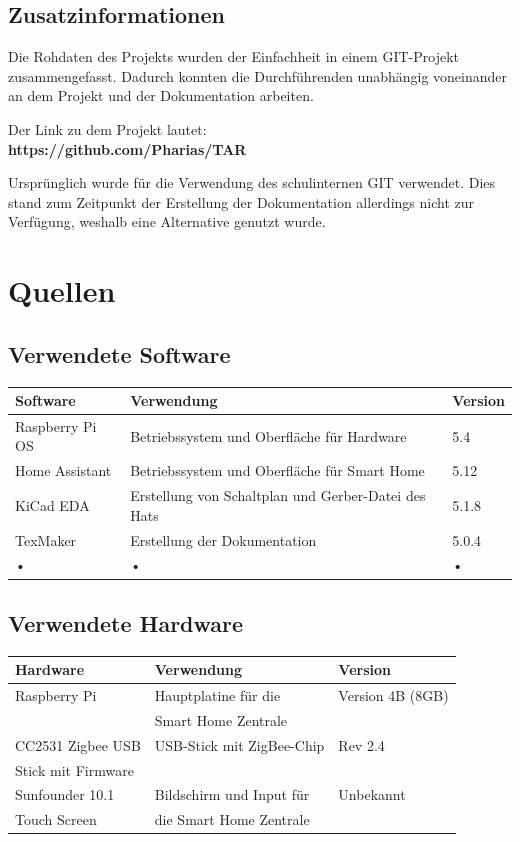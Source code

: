 \documentclass[12pt,a4paper]{article}
\begin{document}
 	\subsection{Zusatzinformationen}
 	Die Rohdaten des Projekts wurden der Einfachheit in einem GIT-Projekt zusammengefasst. Dadurch konnten die Durchführenden unabhängig voneinander an dem Projekt und der Dokumentation arbeiten.\par
 	Der Link zu dem Projekt lautet:\\
 	\textbf{https://github.com/Pharias/TAR}\par
 	Ursprünglich wurde für die Verwendung des schulinternen GIT verwendet. Dies stand zum Zeitpunkt der Erstellung der Dokumentation allerdings nicht zur Verfügung, weshalb eine Alternative genutzt wurde.
 	\newpage
 	\section{Quellen}
 	\subsection{Verwendete Software}
 	\begin{tabular}{|l|l|l|}
 	\hline 
 	\textbf{Software} & \textbf{Verwendung} & \textbf{Version} \\ 
 	\hline 
 	Raspberry Pi OS & Betriebssystem und Oberfläche für Hardware & 5.4 \\ 
 	\hline 
 	Home Assistant & Betriebssystem und Oberfläche für Smart Home & 5.12 \\ 
 	\hline 
 	KiCad EDA & Erstellung von Schaltplan und Gerber-Datei des Hats & 5.1.8 \\ 
 	\hline 
 	TexMaker & Erstellung der Dokumentation & 5.0.4 \\ 
 	\hline 
 	• & • & • \\ 
 	\hline 
 	\end{tabular} 
 	\newpage
 	\subsection{Verwendete Hardware}
 	\begin{tabular}{|l|l|l|}
 	\hline
 	\textbf{Hardware} & \textbf{Verwendung} & \textbf{Version} \\
 	\hline
 	Raspberry Pi & Hauptplatine für die  & Version 4B (8GB)\\
 	 & Smart Home Zentrale &\\
 	\hline
 	CC2531 Zigbee USB & USB-Stick mit ZigBee-Chip & Rev 2.4\\
 	Stick mit Firmware& & \\
 	\hline
 	Sunfounder 10.1  & Bildschirm und Input für & Unbekannt\\
 	Touch Screen & die Smart Home Zentrale & \\
 	 \hline
 	\end{tabular}
\end{document}
